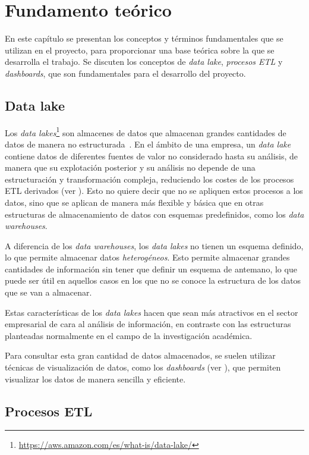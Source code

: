 \chapter{Fundamento teórico}\label{chap:teoria}
En este capítulo se presentan los conceptos y términos fundamentales que se utilizan en el
proyecto, para proporcionar una base teórica sobre la que se desarrolla el trabajo. Se discuten
los conceptos de \textit{data lake}, \textit{procesos ETL} y \textit{dashboards}, que son
fundamentales para el desarrollo del proyecto.

\section{Data lake}\label{sec:datalake}
Los \textit{data lakes}\footnote{\url{https://aws.amazon.com/es/what-is/data-lake/}}
son almacenes de datos que almacenan grandes cantidades de datos de manera no
estructurada~\cite{mier2023dashboards}. En el ámbito de una empresa, un \textit{data lake}
contiene datos de diferentes fuentes de valor no considerado hasta su análisis, de manera
que su explotación posterior y su análisis no depende de una estructuración y transformación
compleja, reduciendo los costes de los procesos ETL derivados (ver ). Esto
no quiere decir que no se apliquen estos procesos a los datos, sino que se aplican de manera
más flexible y básica que en otras estructuras de almacenamiento de datos con esquemas
predefinidos, como los \textit{data warehouses}.~\cite{pwint2018data}

A diferencia de los \textit{data warehouses}, los \textit{data lakes} no tienen un
esquema definido, lo que permite almacenar datos \textit{heterogéneos}. Esto permite
almacenar grandes cantidades de información sin tener que definir un esquema de antemano,
lo que puede ser útil en aquellos casos en los que no se conoce la estructura de los
datos que se van a almacenar.

Estas características de los \textit{data lakes} hacen que sean más atractivos en el sector
empresarial de cara al análisis de información, en contraste con las estructuras planteadas
normalmente en el campo de la investigación académica.

Para consultar esta gran cantidad de datos almacenados, se suelen utilizar técnicas de
visualización de datos, como los \textit{dashboards} (ver ), que
permiten visualizar los datos de manera sencilla y eficiente.

\newpage{}
\section{Procesos ETL}\label{sec:etl}
